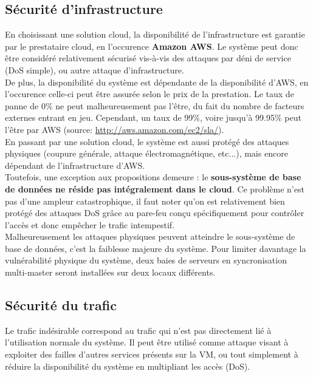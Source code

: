 \subsection{Sécurité d'infrastructure}
\label{subsec:securite-infrastructure}

En choisissant une solution cloud, la disponibilité de l'infrastructure est
garantie par le prestataire cloud, en l'occurence \textbf{Amazon AWS}. Le
système peut donc être considéré relativement sécurisé vis-à-vis des attaques
par déni de service (DoS simple), ou autre attaque d'infrastructure. \\

De plus, la disponibilité du système est dépendante de la disponibilité d'AWS,
en l'occurence celle-ci peut être assurée selon le prix de la prestation. Le
taux de panne de 0\% ne peut malheureusement pas l'être, du fait du nombre de
facteurs externes entrant en jeu. Cependant, un taux de 99\%, voire jusqu'à
99.95\% peut l'être par AWS (source: \url{http://aws.amazon.com/ec2/sla/}). \\

En passant par une solution cloud, le système est aussi protégé des attaques
physiques (coupure générale, attaque électromagnétique, etc...), mais encore
dépendant de l'infrastructure d'AWS. \\

Toutefois, une exception aux propositions demeure : le \textbf{sous-système de
base de données ne réside pas intégralement dans le cloud}. Ce problème n'est
pas d'une ampleur catastrophique, il faut noter qu'on est relativement bien
protégé des attaques DoS grâce au pare-feu conçu spécifiquement pour contrôler
l'accès et donc empêcher le trafic intempestif. \\

Malheureusement les attaques physiques peuvent atteindre le sous-système de
base de données, c'est la faiblesse majeure du système. Pour limiter davantage
la vulnérabilité physique du système, deux baies de serveurs en syncronisation
multi-master seront installées sur deux locaux différents.

\subsection{Sécurité du trafic}
\label{subsec:securite-trafic}

Le trafic indésirable correspond au trafic qui n'est pas directement lié à
l'utilisation normale du système. Il peut être utilisé comme attaque visant à
exploiter des failles d'autres services présents sur la VM, ou tout
simplement à réduire la disponibilité du système en multipliant les
accès (DoS). \\

